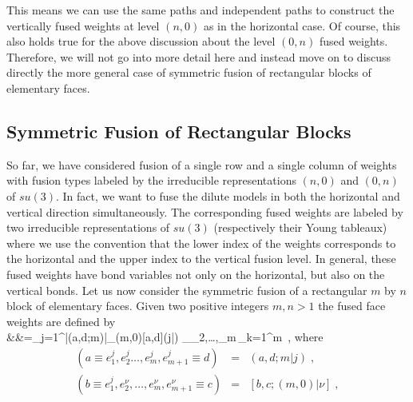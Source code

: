 This means we can use the same paths and independent paths to construct
the vertically fused weights at level $(n,0)$ as in the horizontal case.
Of course, this also holds true for the above discussion about
the level $(0,n)$ fused weights. Therefore, we will not go into more
detail here and instead move on to discuss directly the more general case
of symmetric fusion of rectangular blocks of elementary faces.


\subsection{Symmetric Fusion of Rectangular Blocks}

So far, we have considered fusion of a single row and
a single column of weights with fusion types labeled by the irreducible
representations $(n,0)$ and $(0,n)$ of $su(3)$.
In fact, we want to fuse the dilute models in both the
horizontal and vertical direction simultaneously.
The corresponding fused weights
are labeled by two irreducible representations of $su(3)$
(respectively their Young tableaux) where we
use the convention that the lower index of the weights corresponds
to the horizontal and the upper index to the vertical fusion level.
In general, these fused weights have bond variables not only
on the horizontal, but also on the vertical bonds.
Let us now consider the symmetric fusion of a rectangular
$m$ by $n$ block of elementary faces. Given two  positive integers
$m,n>1$ the fused face weights are defined by
\be
{}  \no\\
&&\hspace*{-10mm}=\sum_{j=1}^{|(a,d;m)|}\!\phi_{(m,0)}[a,d]{(j|\mu)}\!
                 \sum_{\alpha_2,\ldots,\alpha_{m}}\,\prod_{k=1}^{m}\,
     ,\label{(m,0)(n,0)}
\ee
where
\begin{eqnarray*}
(a\equiv e_1^j,e_2^j\ldots,e_{m}^j,e_{m+1}^j\equiv d)
& = & (a,d;m|j) \;, \\
(b\equiv e_1^j,e_2^{\nu},\ldots,e_{m}^{\nu},e_{m+1}^{\nu}\equiv c)
& = & [b,c;(m,0)|\nu] \;,
\end{eqnarray*}
